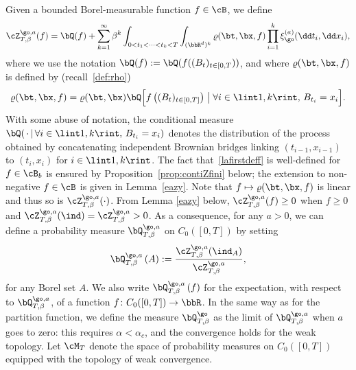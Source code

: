 Given a bounded Borel-measurable function $f\in \cB$, we define
\begin{equation}\label{lafirstdeff}
\cZ^{\go,a}_{T,\beta}(f)=\bQ(f)+\sum_{k=1}^\infty \beta^k\int_{0<t_1<\dots<t_k<T}\int_{(\bbR^d)^k} \varrho(\bt,\bx, f) \prod_{i=1}^k \xi_{\go}^{(a)} (\dd t_i, \dd x_i),
\end{equation}
where we use the notation $\bQ(f) := \bQ(f((B_t)_{t\in [0,T}))$,
and where $\varrho(\bt,\bx, f)$ is defined by
(recall~\eqref{def:rho})
\begin{equation}\label{defvarro}
\varrho(\bt,\bx, f)= \varrho(\bt,\bx) \bQ\Bigl[ f\left((B_{t})_{t\in [0,T]}\right)\bigm| \forall i\in \lint 1,k \rint, \, B_{t_i}=x_i\Bigr].
\end{equation}
With some abuse of notation,
the conditional measure $\bQ(\, \cdot \, | \, \forall i\in \lint 1,k \rint, \, B_{t_i}=x_i)$ denotes the distribution of the process obtained by concatenating independent Brownian bridges linking $(t_{i-1},x_{i-1})$ to $(t_{i},x_{i})$ for $ i\in \lint 1,k \rint$.
The fact that~\eqref{lafirstdeff} is well-defined for $f\in \cB_b$ is ensured by Proposition~\ref{prop:contiZfini} below; the extension to non-negative $f\in \cB$ is given in Lemma~\ref{eazy}.
Note that $f\mapsto \varrho(\bt, \bx, f)$ is linear and thus so is $\cZ^{\go,a}_{T,\beta}(\cdot)$.
From Lemma \ref{eazy} below, $\cZ^{\go,a}_{T,\beta}(f)\ge 0$ when $f\ge 0$ and $\cZ^{\go,a}_{T,\beta}(\ind)=\cZ^{\go,a}_{T,\beta}> 0$. As a consequence,
for any $a>0$, we can define a probability measure
$\bQ^{\go,a}_{T,\beta}$ on $C_0([0,T])$ by setting
\begin{equation}\label{QTA}
\bQ^{\go,a}_{T,\beta}\left(A \right):= \frac{\cZ^{\go,a}_{T,\beta}(\ind_{A})}{\cZ^{\go,a}_{T,\beta}},
\end{equation}
for any Borel set $A$.
We also write $\bQ^{\go,a}_{T,\beta}\left(f \right)$ for the expectation, with respect to $\bQ^{\go,a}_{T,\beta}$,
of a function $f \colon C_0([0,T])\to \bbR$.
In the same way as for the partition function, we define the measure $\bQ^{\go}_{T,\beta}$ as the limit of $\bQ^{\go,a}_{T,\beta}$ when $a$ goes to zero: this requires $\alpha<\alpha_c$, and the convergence holds for the weak topology.
Let $\cM_T$ denote the space of probability measures on $C_0([0,T])$ equipped with the topology of weak convergence.

